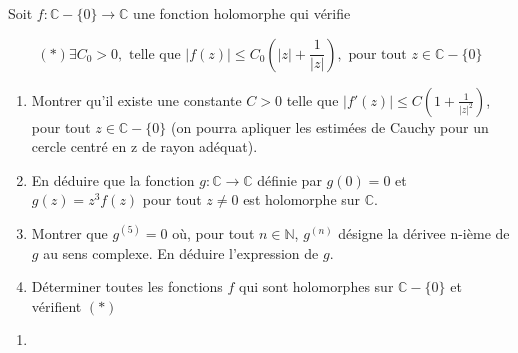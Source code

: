 \documentclass[10pt,a4paper,oneside]{article}
\newenvironment{exercice}[1][Exercice]{\begin{trivlist}
\item[\hskip \labelsep {\bfseries #1}]}{\end{trivlist}}
\newenvironment{solution}[1][Solution]{\begin{trivlist}
\item[\hskip \labelsep {\bfseries #1}]}{\end{trivlist}}
\begin{document}
\begin{exercice}
Soit $f: \mathbb{C} - \{ 0 \} \to \mathbb{C}$ une fonction holomorphe qui vérifie

\[ (*) \exists C_0 > 0, \text{ telle que } |f(z)| \leq C_0(|z| + \frac{1}{|z|}), \text{ pour tout } z \in \mathbb{C} - \{ 0 \} \]

\begin{enumerate}
\item
Montrer qu'il existe une constante $C > 0$ telle que $|f'(z)| \leq C(1 + \frac{1}{|z|^2})$, pour tout $z \in \mathbb{C} - \{ 0 \}$ (on pourra apliquer les estimées de Cauchy pour un cercle centré en z de rayon adéquat).

\item
En déduire que la fonction $g: \mathbb{C} \to \mathbb{C}$ définie par $g(0) = 0$ et $g(z) = z^3 f(z)$ pour tout $z \neq 0$ est holomorphe sur $\mathbb{C}$.

\item
Montrer que $g^{(5)} = 0$ où, pour tout $n \in \mathbb{N}$, $g^{(n)}$ désigne la dérivee n-ième de $g$ au sens complexe. En déduire l'expression de $g$.

\item
Déterminer toutes les fonctions $f$ qui sont holomorphes sur $\mathbb{C} - \{ 0 \}$ et vérifient $(*)$
\end{enumerate}

\end{exercice}

\begin{solution}

\begin{enumerate}
\item


\end{enumerate}

\end{solution}
\end{document}
